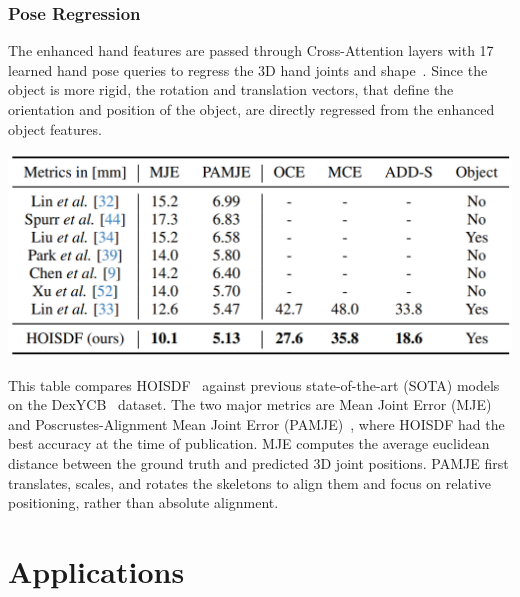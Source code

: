 \documentclass{article}
\begin{document}
\subsubsection*{Pose Regression}

The enhanced hand features are passed through Cross-Attention layers with 17 learned hand pose queries to regress the 3D hand joints and shape~\cite{hampali2022keypointtransformer}. Since the object is more rigid, the rotation and translation vectors, that define the orientation and position of the object, are directly regressed from the enhanced object features.

\begin{center}
    \includegraphics[scale=0.3]{hoisdf-4.png}
\end{center}

This table compares HOISDF~\cite{qi2024hoisdf} against previous state-of-the-art (SOTA) models on the DexYCB~\cite{chao2021dexycb} dataset. The two major metrics are Mean Joint Error (MJE) and Poscrustes-Alignment Mean Joint Error (PAMJE)~\cite{zimmermann2017handpose}, where HOISDF had the best accuracy at the time of publication. MJE computes the average euclidean distance between the ground truth and predicted 3D joint positions. PAMJE first translates, scales, and rotates the skeletons to align them and focus on relative positioning, rather than absolute alignment.

\section*{Applications}
\end{document}
